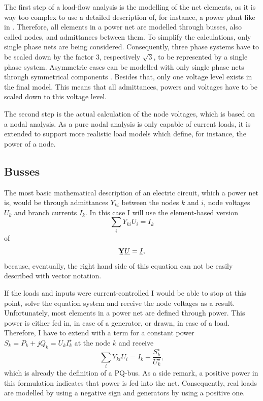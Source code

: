 The first step of a load-flow analysis is the modelling of the net elements, as it is way too complex to use a detailed description of, for instance, a power plant like in . Therefore, all elements in a power net are modelled through busses, also called nodes, and admittances between them. To simplify the calculations, only single phase nets are being considered. Consequently, three phase systems have to be scaled down by the factor 3, respectively $\sqrt{3}$, to be represented by a single phase system. Asymmetric cases can be modelled with only single phase nets through symmetrical components \citep[p. 399]{powerSystemAnalysis}. Besides that, only one voltage level exists in the final model. This means that all admittances, powers and voltages have to be scaled down to this voltage level.

The second step is the actual calculation of the node voltages, which is based on a nodal analysis. As a pure nodal analysis is only capable of current loads, it is extended to support more realistic load models which define, for instance, the power of a node.

\subsection{Busses}

The most basic mathematical description of an electric circuit, which a power net is, would be through admittances $Y_{ki}$ between the nodes $k$ and $i$, node voltages $U_k$ and branch currents $I_k$. In this case I will use the element-based version
\begin{equation}
	\sum_i Y_{ki} U_i = I_k
	\label{eq:current_controlled}
\end{equation}
of
\begin{equation}
	\mat Y \vec U = \vec I,
\end{equation}
because, eventually, the right hand side of this equation can not be easily described with vector notation.

If the loads and inputs were current-controlled I would be able to stop at this point, solve the equation system and receive the node voltages as a result. Unfortunately, most elements in a power net are defined through power. This power is either fed in, in case of a generator, or drawn, in case of a load. Therefore, I have to extend  with a term for a constant power $S_k = P_k + j Q_k = U_k I_k^\star$ at the node $k$ and receive
\begin{equation}
	\sum_i Y_{ki} U_i = I_k + \frac{S_k^\star}{U_k^\star},
	\label{eq:pq_bus}
\end{equation}
which is already the definition of a PQ-bus. As a side remark, a positive power in this formulation indicates that power is fed into the net. Consequently, real loads are modelled by using a negative sign and generators by using a positive one.


